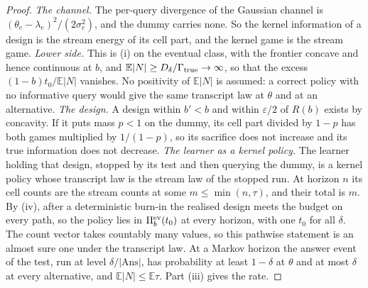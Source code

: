 \begin{proof}
\emph{The channel.} The per-query divergence of the Gaussian channel is
$(\theta_e-\lambda_e)^2/(2\sigma_e^2)$, and the dummy carries none. So the kernel information of a
design is the stream energy of its cell part, and the kernel game is the stream game.
\emph{Lower side.} This is (i) on the eventual class, with the frontier concave and hence
continuous at $b$, and $\mathbb E|N|\ge D_\delta/\Gamma_{\rm true}\to\infty$, so that the excess
$(1-b)t_0/\mathbb E|N|$ vanishes. No positivity of $\mathbb E|N|$ is assumed: a correct policy
with no informative query would give the same transcript law at $\theta$ and at an alternative.
\emph{The design.} A design within $b'<b$ and within $\varepsilon/2$ of $R(b)$ exists by
concavity. If it puts mass $p<1$ on the dummy, its cell part divided by $1-p$ has both games
multiplied by $1/(1-p)$, so its sacrifice does not increase and its true information does not
decrease.
\emph{The learner as a kernel policy.} The learner holding that design, stopped by its test and
then querying the dummy, is a kernel policy whose transcript law is the stream law of the stopped
run. At horizon $n$ its cell counts are the stream counts at some $m\le\min(n,\tau)$, and their
total is $m$. By (iv), after a deterministic burn-in the realised design meets the budget on
every path, so the policy lies in $\Pi_b^{\rm ev}(t_0)$ at every horizon, with one $t_0$ for all
$\delta$. The count vector takes countably many values, so this pathwise statement is an almost
sure one under the transcript law. At a Markov horizon the answer event of the test, run at level
$\delta/|\mathrm{Ans}|$, has probability at least $1-\delta$ at $\theta$ and at most $\delta$ at
every alternative, and $\mathbb E|N|\le\mathbb E\tau$. Part (iii) gives the rate.
\end{proof}

